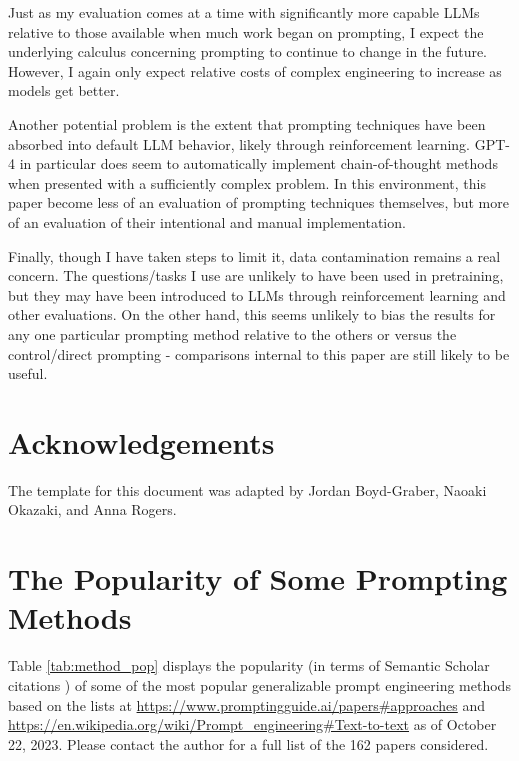\documentclass[11pt]{article}
\begin{document}
Just as my evaluation comes at a time with significantly more capable LLMs relative to those available when much work began on prompting, I expect the underlying calculus concerning prompting to continue to change in the future. However, I again only expect relative costs of complex engineering to increase as models get better.

Another potential problem is the extent that prompting techniques have been absorbed into default LLM behavior, likely through reinforcement learning. GPT-4 in particular does seem to automatically implement chain-of-thought methods when presented with a sufficiently complex problem. In this environment, this paper become less of an evaluation of prompting techniques themselves, but more of an evaluation of their intentional and manual implementation.

Finally, though I have taken steps to limit it, data contamination remains a real concern. The questions/tasks I use are unlikely to have been used in pretraining, but they may have been introduced to LLMs through reinforcement learning and other evaluations. On the other hand, this seems unlikely to bias the results for any one particular prompting method relative to the others or versus the control/direct prompting - comparisons internal to this paper are still likely to be useful.

\section*{Acknowledgements}
The template for this document was adapted by Jordan Boyd-Graber, Naoaki Okazaki, and Anna Rogers.




\appendix

\section{The Popularity of Some Prompting Methods}

Table \ref{tab:method_pop} displays the popularity (in terms of Semantic Scholar citations \cite{noauthor_semantic_nodate}) of some of the most popular generalizable prompt engineering methods based on the lists at \url{https://www.promptingguide.ai/papers#approaches} and \url{https://en.wikipedia.org/wiki/Prompt_engineering#Text-to-text} as of October 22, 2023. Please contact the author for a full list of the 162 papers considered.
\end{document}
